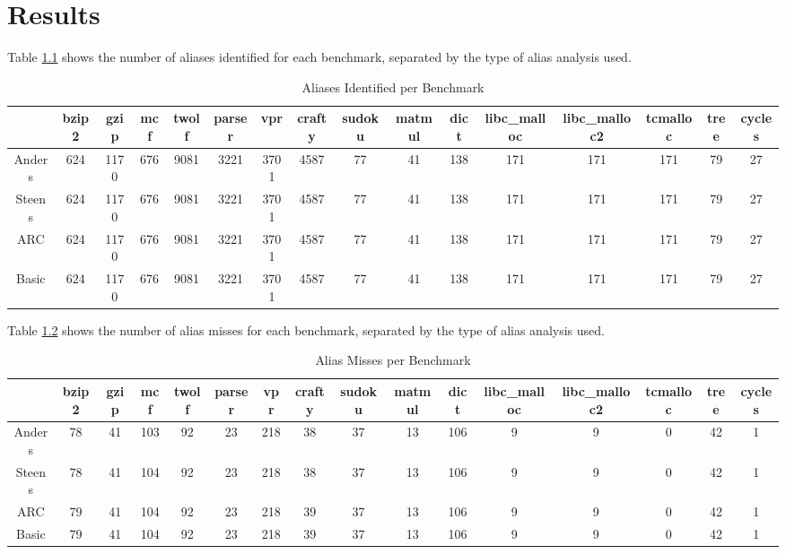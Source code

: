 \chapter{Results}

Table \ref{table:1} shows the number of aliases identified for each benchmark, separated by the type of alias analysis used.

\begin{table} [h!]
\centering
   \begin{tabular} {|c|c c c c c c c c c c c c c c c|}
      \hline
      & bzip2 & gzip & mcf & twolf & parser & vpr & crafty & sudoku & matmul & dict & libc\_malloc & libc\_malloc2 & tcmalloc & tree & cycles \\
      \hline
      Anders & 624 & 1170 & 676 & 9081 & 3221 & 3701 & 4587 & 77 & 41 & 138 & 171 & 171 & 171 & 79 & 27 \\
      \hline
      Steens & 624 & 1170 & 676 & 9081 & 3221 & 3701 & 4587 & 77 & 41 & 138 & 171 & 171 & 171 & 79 & 27 \\
      \hline
      ARC & 624 & 1170 & 676 & 9081 & 3221 & 3701 & 4587 & 77 & 41 & 138 & 171 & 171 & 171 & 79 & 27 \\
      \hline
      Basic & 624 & 1170 & 676 & 9081 & 3221 & 3701 & 4587 & 77 & 41 & 138 & 171 & 171 & 171 & 79 & 27 \\
      \hline
   \end{tabular}
   \caption{Aliases Identified per Benchmark}
   \label{table:1}
\end{table}

Table \ref{table:2} shows the number of alias misses for each benchmark, separated by the type of alias analysis used.

\begin{table} [h!]
\centering
   \begin{tabular} {|c|c c c c c c c c c c c c c c c|}
      \hline
      & bzip2 & gzip & mcf & twolf & parser & vpr & crafty & sudoku & matmul & dict & libc\_malloc & libc\_malloc2 & tcmalloc & tree & cycles \\
      \hline
      Anders & 78 & 41 & 103 & 92 & 23 & 218 & 38 & 37 & 13 & 106 & 9 & 9 & 0 & 42 & 1\\
      \hline
      Steens & 78 & 41 & 104 & 92 & 23 & 218 & 38 & 37 & 13 & 106 & 9 & 9 & 0 & 42 & 1\\
      \hline
      ARC & 79 & 41 & 104 & 92 & 23 & 218 & 39 & 37 & 13 & 106 & 9 & 9 & 0 & 42 & 1\\
      \hline
      Basic & 79 & 41 & 104 & 92 & 23 & 218 & 39 & 37 & 13 & 106 & 9 & 9 & 0 & 42 & 1\\
      \hline
   \end{tabular}
   \caption{Alias Misses per Benchmark}
   \label{table:2}
\end{table}

